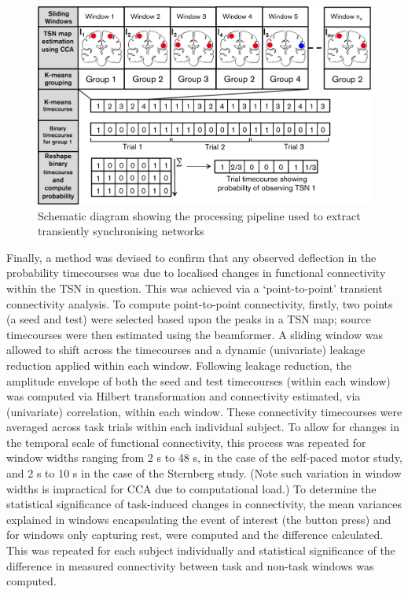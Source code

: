 	\begin{figure}[h]
		\begin{center}
			\includegraphics[width=\linewidth]{./images/chapter5/Figure_2.png}
			\caption{Schematic diagram showing the processing pipeline used to extract transiently synchronising networks \label{figure_5_2}}
		\end{center}
	\end{figure}

Finally, a method was devised to confirm that any observed deflection in the probability timecourses was due to localised changes in functional connectivity within the TSN in question. This was achieved via a ‘point-to-point’ transient connectivity analysis. To compute point-to-point connectivity, firstly, two points (a seed and test) were selected based upon the peaks in a TSN map; source timecourses were then estimated using the beamformer. A sliding window was allowed to shift across the timecourses and a dynamic (univariate) leakage reduction applied within each window. Following leakage reduction, the amplitude envelope of both the seed and test timecourses (within each window) was computed via Hilbert transformation and connectivity estimated, via (univariate) correlation, within each window. These connectivity timecourses were averaged across task trials within each individual subject. To allow for changes in the temporal scale of functional connectivity, this process was repeated for window widths ranging from 2 s to 48 s, in the case of the self-paced motor study, and 2 s to 10 s in the case of the Sternberg study. (Note such variation in window widths is impractical for CCA due to computational load.) To determine the statistical significance of task-induced changes in connectivity, the mean variances explained in windows encapsulating the event of interest (the button press) and for windows only capturing rest, were computed and the difference calculated. This was repeated for each subject individually and statistical significance of the difference in measured connectivity between task and non-task windows was computed.

